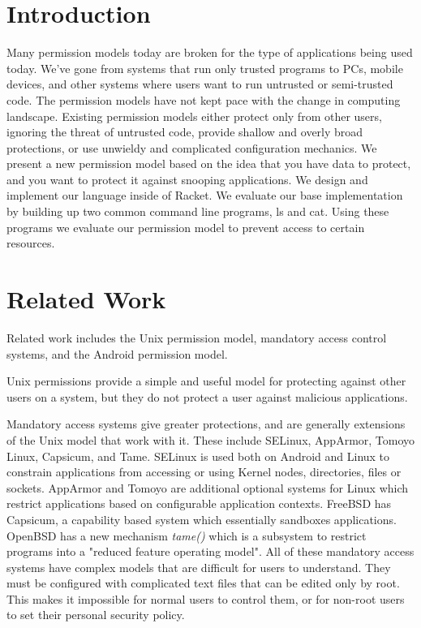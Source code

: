 \section{Introduction}\label{section:Introduction}
Many permission models today are broken for the type of applications being used today. We've gone from systems that run only trusted programs to PCs, mobile devices, and other systems where users want to run untrusted or semi-trusted code. The permission models have not kept pace with the change in computing landscape. Existing permission models either protect only from other users, ignoring the threat of untrusted code, provide shallow and overly broad protections, or use unwieldy and complicated configuration mechanics. We present a new permission model based on the idea that you have data to protect, and you want to protect it against snooping applications. We design and implement our language inside of Racket\cite{racket}. We evaluate our base implementation by building up two common command line programs, ls and cat. Using these programs we evaluate our permission model to prevent access to certain resources.

\section{Related Work}\label{section:relatedwork}
Related work includes the Unix permission model, mandatory access control systems, and the Android permission model.

Unix permissions provide a simple and useful model for protecting against other users on a system, but they do not protect a user against malicious applications.

Mandatory access systems give greater protections, and are generally extensions of the Unix model that work with it.  These include SELinux, AppArmor, Tomoyo Linux, Capsicum, and Tame.
SELinux is used both on Android and Linux to constrain applications from accessing or using Kernel nodes, directories, files or sockets. 
AppArmor and Tomoyo are additional optional systems for Linux which restrict applications based on configurable application contexts.
FreeBSD has Capsicum, a capability based system which essentially sandboxes applications. 
OpenBSD has a new mechanism \textit{tame()} which is a subsystem  to restrict programs into a "reduced feature operating model".
All of these mandatory access systems have complex models that are difficult for users to understand.  
They must be configured with complicated text files that can be edited only by root.  
This makes it impossible for normal users to control them, or for non-root users to set their personal security policy.

